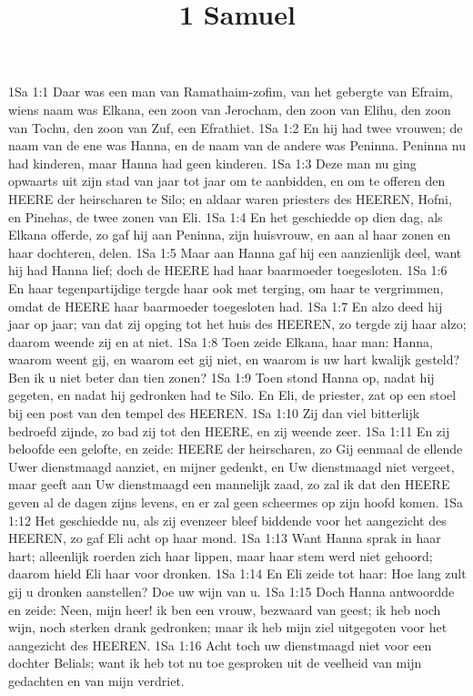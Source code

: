 

\title{1 Samuel}


1Sa 1:1  Daar was een man van Ramathaim-zofim, van het gebergte van Efraim, wiens naam was Elkana, een zoon van Jerocham, den zoon van Elihu, den zoon van Tochu, den zoon van Zuf, een Efrathiet.
1Sa 1:2  En hij had twee vrouwen; de naam van de ene was Hanna, en de naam van de andere was Peninna. Peninna nu had kinderen, maar Hanna had geen kinderen.
1Sa 1:3  Deze man nu ging opwaarts uit zijn stad van jaar tot jaar om te aanbidden, en om te offeren den HEERE der heirscharen te Silo; en aldaar waren priesters des HEEREN, Hofni, en Pinehas, de twee zonen van Eli.
1Sa 1:4  En het geschiedde op dien dag, als Elkana offerde, zo gaf hij aan Peninna, zijn huisvrouw, en aan al haar zonen en haar dochteren, delen.
1Sa 1:5  Maar aan Hanna gaf hij een aanzienlijk deel, want hij had Hanna lief; doch de HEERE had haar baarmoeder toegesloten.
1Sa 1:6  En haar tegenpartijdige tergde haar ook met terging, om haar te vergrimmen, omdat de HEERE haar baarmoeder toegesloten had.
1Sa 1:7  En alzo deed hij jaar op jaar; van dat zij opging tot het huis des HEEREN, zo tergde zij haar alzo; daarom weende zij en at niet.
1Sa 1:8  Toen zeide Elkana, haar man: Hanna, waarom weent gij, en waarom eet gij niet, en waarom is uw hart kwalijk gesteld? Ben ik u niet beter dan tien zonen?
1Sa 1:9  Toen stond Hanna op, nadat hij gegeten, en nadat hij gedronken had te Silo. En Eli, de priester, zat op een stoel bij een post van den tempel des HEEREN.
1Sa 1:10  Zij dan viel bitterlijk bedroefd zijnde, zo bad zij tot den HEERE, en zij weende zeer.
1Sa 1:11  En zij beloofde een gelofte, en zeide: HEERE der heirscharen, zo Gij eenmaal de ellende Uwer dienstmaagd aanziet, en mijner gedenkt, en Uw dienstmaagd niet vergeet, maar geeft aan Uw dienstmaagd een mannelijk zaad, zo zal ik dat den HEERE geven al de dagen zijns levens, en er zal geen scheermes op zijn hoofd komen.
1Sa 1:12  Het geschiedde nu, als zij evenzeer bleef biddende voor het aangezicht des HEEREN, zo gaf Eli acht op haar mond.
1Sa 1:13  Want Hanna sprak in haar hart; alleenlijk roerden zich haar lippen, maar haar stem werd niet gehoord; daarom hield Eli haar voor dronken.
1Sa 1:14  En Eli zeide tot haar: Hoe lang zult gij u dronken aanstellen? Doe uw wijn van u.
1Sa 1:15  Doch Hanna antwoordde en zeide: Neen, mijn heer! ik ben een vrouw, bezwaard van geest; ik heb noch wijn, noch sterken drank gedronken; maar ik heb mijn ziel uitgegoten voor het aangezicht des HEEREN.
1Sa 1:16  Acht toch uw dienstmaagd niet voor een dochter Belials; want ik heb tot nu toe gesproken uit de veelheid van mijn gedachten en van mijn verdriet.
